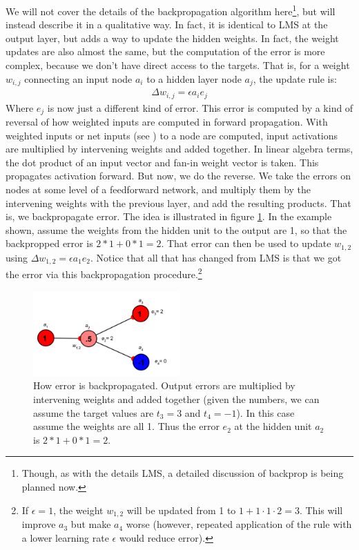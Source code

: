 We will not cover the details of the backpropagation algorithm here\footnote{Though, as with the details LMS, a detailed discussion of backprop is being planned now.}, but will instead describe it in a qualitative way. In fact, it is identical to LMS at the output layer, but adds a way to update the hidden weights. In fact, the weight updates are also almost the same, but the computation of the error is more complex, because we don't have direct access to the targets. That is, for a weight $w_{i,j}$ connecting an input node $a_i$ to a hidden layer node $a_j$, the update rule is:
\begin{eqnarray*}
\Delta w_{i,j}  =  \epsilon a_i e_j
\end{eqnarray*}
Where $e_j$ is now just a different kind of error. This error is computed by a kind of reversal of how weighted inputs are computed in forward propagation. With weighted inputs or net inputs (see ) to a node are computed, input activations are multiplied by intervening weights and added together. In linear algebra terms, the dot product of an input vector and fan-in weight vector is taken. This propagates activation forward. But now, we do the reverse. We take the errors on nodes at some level of a feedforward network, and multiply them by the intervening weights with the previous layer, and add the resulting products.  That is, we backpropagate error. The idea is illustrated in figure \ref{backprop_error}. In the example shown, assume the weights from the hidden unit to the output are 1, so that the backpropped error is $2 * 1 + 0 * 1 = 2$. That error can then be used to update $w_{1,2}$ using  $\Delta w_{1,2}  =  \epsilon a_1 e_2$. Notice that all that has changed from LMS is that we got the error via this backpropagation procedure.\footnote{If $\epsilon = 1$, the weight  $w_{1,2}$ will be updated from 1 to $1 + 1 \cdot 1 \cdot 2 = 3$. This will improve $a_3$ but make $a_4$ worse (however, repeated application of the rule with a lower learning rate $\epsilon$  would reduce error).}
\begin{figure}[h]
\centering
\includegraphics[width=0.5\textwidth]{images/backpropError}
\caption[Jeff Yoshimi.]{How error is backpropagated. Output errors are multiplied by intervening weights and added together (given the numbers, we can assume the target values are $t_3 = 3$ and $t_4 = -1$). In this case assume the weights are all 1. Thus the error $e_2$ at the hidden unit $a_2$ is $2 * 1 + 0 * 1 = 2$.}
\label{backprop_error}
\end{figure}

